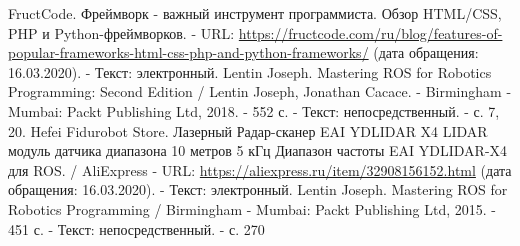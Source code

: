 \documentclass[12pt,a4paper]{scrartcl}
\newlength{\ML}
\begin{document}
	\begin{thebibliography}{9}
		 FructCode. Фреймворк - важный инструмент программиста. Обзор HTML/CSS, PHP и Python-фреймворков. - URL:
 \url{https://fructcode.com/ru/blog/features-of-popular-frameworks-html-css-php-and-python-frameworks/} (дата обращения: 16.03.2020). - Текст: электронный.
		 Lentin Joseph. Mastering ROS for Robotics Programming: Second Edition / Lentin Joseph, Jonathan Cacace. - Birmingham - Mumbai: Packt Publishing Ltd, 2018. - 552 с. - Текст: непосредственный. - с. 7, 20.
		 Hefei Fidurobot Store. Лазерный Радар-сканер EAI YDLIDAR X4 LIDAR модуль датчика диапазона 10 метров 5 кГц Диапазон частоты EAI YDLIDAR-X4 для ROS. / AliExpress - URL: \url{https://aliexpress.ru/item/32908156152.html} (дата обращения: 16.03.2020). - Текст: электронный.
		 Lentin Joseph. Mastering ROS for Robotics Programming / Birmingham - Mumbai: Packt Publishing Ltd, 2015. - 451 с. - Текст: непосредственный. - с. 270
	\end{thebibliography}
			
	
\end{document}

